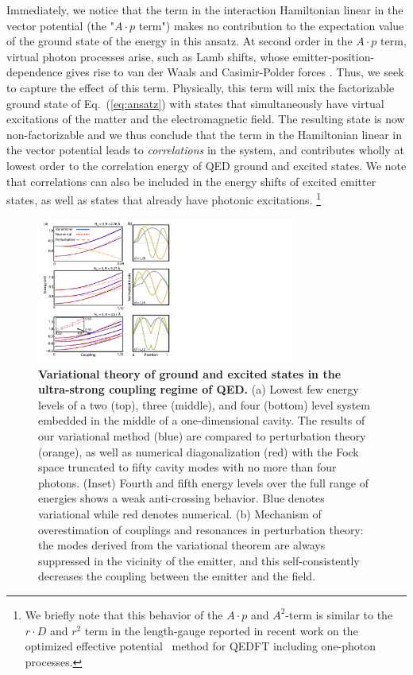 \documentclass[aps,prl,twocolumn,
	groupedaddress,superscriptaddress,
	amsfonts,amssymb,amsmath,floatfix,
	citeautoscript]{revtex4-1}
\begin{document}
Immediately, we notice that the term in the interaction Hamiltonian linear in the vector potential (the "$A\cdot p$ term") makes no contribution to the expectation value of the ground state of the energy in this ansatz. At second order in the $A\cdot p$ term, virtual photon processes arise, such as Lamb shifts, whose emitter-position-dependence gives rise to van der Waals and Casimir-Polder forces  \cite{scheel2009macroscopic}. Thus, we seek to capture the effect of this term. Physically, this term will mix the factorizable ground state of Eq.~(\ref{eq:ansatz}) with states that simultaneously have virtual excitations of the matter and the electromagnetic field. The resulting state is now non-factorizable and we thus conclude that the term in the Hamiltonian linear in the vector potential leads to \textit{correlations} in the system, and contributes wholly at lowest order to the correlation energy of QED ground and excited states. We note that correlations can also be included in the energy shifts of excited emitter states, as well as states that already have photonic excitations. \footnote{We briefly note that this behavior of the $A\cdot p$ and $A^2$-term is similar to the ${r}\cdot D$ and $r^2$ term in the length-gauge reported in recent work on the optimized effective potential~\cite{pellegrini2015,flick2017c} method for QEDFT including one-photon processes. }
\begin{figure}[t]
\includegraphics[width=8.5cm]{Figure2and3combined.pdf}
\caption{\textbf{Variational theory of ground and excited states in the ultra-strong coupling regime of QED.} (a) Lowest few energy levels of a two (top), three (middle), and four (bottom) level system embedded in the middle of a one-dimensional cavity. The results of our variational method (blue) are compared to perturbation theory (orange), as well as numerical diagonalization (red) with the Fock space truncated to fifty cavity modes with no more than four photons. (Inset) Fourth and fifth energy levels over the full range of energies shows a weak anti-crossing behavior. Blue denotes variational while red denotes numerical. (b) Mechanism of overestimation of couplings and resonances in perturbation theory: the modes derived from the variational theorem are always suppressed in the vicinity of the emitter, and this self-consistently decreases the coupling between the emitter and the field.  }
\label{fig:results}
\end{figure}
\end{document}
